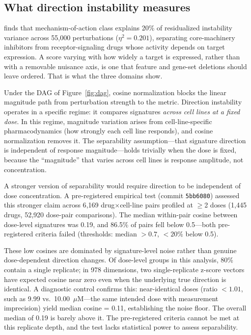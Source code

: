 \documentclass[11pt]{article}
\begin{document}
\subsection{What direction instability measures}

\citet{tower2026atlas} finds that mechanism-of-action class explains 20\% of
residualized instability variance across 55{,}000 perturbations
($\eta^2 = 0.201$), separating core-machinery inhibitors from
receptor-signaling drugs whose activity depends on target expression. A score
varying with how widely a target is expressed, rather than with a removable
nuisance axis, is one that feature and gene-set deletions should leave ordered.
That is what the three domains show.

Under the DAG of Figure~\ref{fig:dag}, cosine normalization blocks the
linear magnitude path from perturbation strength to the metric. Direction
instability operates in a specific regime: it compares signatures
\emph{across cell lines at a fixed dose}. In this regime, magnitude
variation arises from cell-line-specific pharmacodynamics (how strongly
each cell line responds), and cosine normalization removes it. The
separability assumption---that signature direction is independent of
response magnitude---holds trivially when the dose is fixed, because
the ``magnitude'' that varies across cell lines is response amplitude,
not concentration.

A stronger version of separability would require direction to be
independent of dose concentration. A pre-registered empirical test
(commit \texttt{5bb6080}) assessed this stronger claim across 6{,}169
drug$\times$cell-line pairs profiled at $\geq$2 doses (1{,}445 drugs,
52{,}920 dose-pair comparisons). The median within-pair cosine between
dose-level signatures was 0.19, and 86.5\% of pairs fell below
0.5---both pre-registered criteria failed (thresholds: median $> 0.7$,
$< 20\%$ below 0.5).

These low cosines are dominated by signature-level noise rather than
genuine dose-dependent direction changes. Of dose-level groups in this
analysis, 80\% contain a single replicate; in 978 dimensions, two
single-replicate z-score vectors have expected cosine near zero even
when the underlying true direction is identical. A diagnostic control
confirms this: near-identical doses (ratio $< 1.01$, such as 9.99 vs.\
10.00~$\mu$M---the same intended dose with measurement imprecision)
yield median cosine = 0.11, establishing the noise floor. The overall
median of 0.19 is barely above it. The pre-registered criteria cannot
be met at this replicate depth, and the test lacks statistical power
to assess separability.
\end{document}
